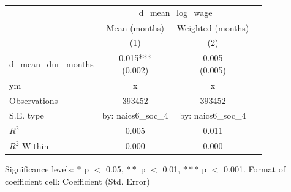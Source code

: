 \renewcommand\cellalign{t}
\begin{threeparttable}
\begin{tabular}{lccc}
\toprule
 & \multicolumn{2}{c}{d_mean_log_wage} \\
\cmidrule(lr){2-3} 
 & Mean (months) & Weighted (months) \\
 & (1) & (2) \\
\midrule
\addlinespace
d_mean_dur_months & \makecell{0.015*** \\ (0.002)} & \makecell{0.005 \\ (0.005)} \\
\midrule
\addlinespace
ym & x & x \\
\midrule
\addlinespace
Observations & 393452 & 393452 \\
S.E. type & by: naics6_soc_4 & by: naics6_soc_4 \\
$R^2$ & 0.005 & 0.011 \\
$R^2$ Within & 0.000 & 0.000 \\
\bottomrule
\end{tabular}
\footnotesize Significance levels: $*$ p $<$ 0.05, $**$ p $<$ 0.01, $***$ p $<$ 0.001. Format of coefficient cell: Coefficient 
 (Std. Error)
\end{threeparttable}